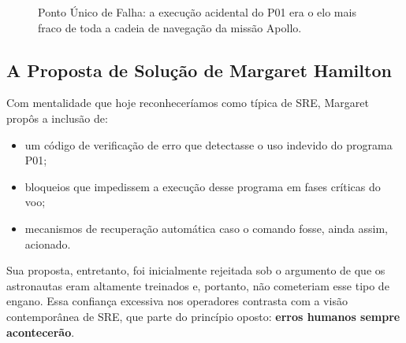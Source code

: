 \documentclass[12pt,a4paper,twoside]{report}
\begin{document}
\begin{figure}[h]
    \caption{Ponto Único de Falha: a execução acidental do P01 era o elo mais fraco de toda a cadeia de navegação da missão Apollo.}
    \label{fig:spof_apollo_final}
\end{figure}

\subsection{A Proposta de Solução de Margaret Hamilton}

Com mentalidade que hoje reconheceríamos como típica de SRE, Margaret
propôs a inclusão de:
\begin{itemize}[nosep]
    \item um código de verificação de erro que detectasse o uso indevido
    do programa P01;
    \item bloqueios que impedissem a execução desse programa em fases
    críticas do voo;
    \item mecanismos de recuperação automática caso o comando fosse, ainda
    assim, acionado.
\end{itemize}

Sua proposta, entretanto, foi inicialmente rejeitada sob o argumento de que
os astronautas eram altamente treinados e, portanto, não cometeriam esse tipo
de engano. Essa confiança excessiva nos operadores contrasta com a visão
contemporânea de SRE, que parte do princípio oposto: \textbf{erros humanos
sempre acontecerão}.
\end{document}
